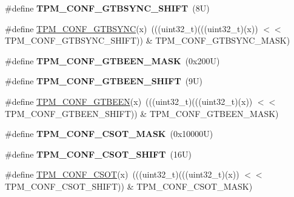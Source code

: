 \begin{DoxyCompactItemize}
\mbox{\label{group___t_p_m___register___masks_ga21d544c3b37febeee7525c8246d7f553}} 
\#define {\bfseries T\+P\+M\+\_\+\+C\+O\+N\+F\+\_\+\+G\+T\+B\+S\+Y\+N\+C\+\_\+\+S\+H\+I\+FT}~(8\+U)
\item 
\#define \mbox{\hyperlink{group___t_p_m___register___masks_ga640f2f1cb26cdd0af7ddb04c89bab413}{T\+P\+M\+\_\+\+C\+O\+N\+F\+\_\+\+G\+T\+B\+S\+Y\+NC}}(x)~(((uint32\+\_\+t)(((uint32\+\_\+t)(x)) $<$$<$ T\+P\+M\+\_\+\+C\+O\+N\+F\+\_\+\+G\+T\+B\+S\+Y\+N\+C\+\_\+\+S\+H\+I\+FT)) \& T\+P\+M\+\_\+\+C\+O\+N\+F\+\_\+\+G\+T\+B\+S\+Y\+N\+C\+\_\+\+M\+A\+SK)
\item 
\mbox{\label{group___t_p_m___register___masks_ga70d64b81799a4ecd3933ea8e46618747}} 
\#define {\bfseries T\+P\+M\+\_\+\+C\+O\+N\+F\+\_\+\+G\+T\+B\+E\+E\+N\+\_\+\+M\+A\+SK}~(0x200\+U)
\item 
\mbox{\label{group___t_p_m___register___masks_ga6ecd0b94ee9f74112c93027dd5833468}} 
\#define {\bfseries T\+P\+M\+\_\+\+C\+O\+N\+F\+\_\+\+G\+T\+B\+E\+E\+N\+\_\+\+S\+H\+I\+FT}~(9\+U)
\item 
\#define \mbox{\hyperlink{group___t_p_m___register___masks_ga3bfa358856f5e6b0b21566a15f371b01}{T\+P\+M\+\_\+\+C\+O\+N\+F\+\_\+\+G\+T\+B\+E\+EN}}(x)~(((uint32\+\_\+t)(((uint32\+\_\+t)(x)) $<$$<$ T\+P\+M\+\_\+\+C\+O\+N\+F\+\_\+\+G\+T\+B\+E\+E\+N\+\_\+\+S\+H\+I\+FT)) \& T\+P\+M\+\_\+\+C\+O\+N\+F\+\_\+\+G\+T\+B\+E\+E\+N\+\_\+\+M\+A\+SK)
\item 
\mbox{\label{group___t_p_m___register___masks_gab1950d4b5e28ba67b305e3fca7f716f0}} 
\#define {\bfseries T\+P\+M\+\_\+\+C\+O\+N\+F\+\_\+\+C\+S\+O\+T\+\_\+\+M\+A\+SK}~(0x10000\+U)
\item 
\mbox{\label{group___t_p_m___register___masks_ga007e2eccc45940318d15822a729ca061}} 
\#define {\bfseries T\+P\+M\+\_\+\+C\+O\+N\+F\+\_\+\+C\+S\+O\+T\+\_\+\+S\+H\+I\+FT}~(16\+U)
\item 
\#define \mbox{\hyperlink{group___t_p_m___register___masks_ga3a769eea9b0e3abc8a49f7a13111b896}{T\+P\+M\+\_\+\+C\+O\+N\+F\+\_\+\+C\+S\+OT}}(x)~(((uint32\+\_\+t)(((uint32\+\_\+t)(x)) $<$$<$ T\+P\+M\+\_\+\+C\+O\+N\+F\+\_\+\+C\+S\+O\+T\+\_\+\+S\+H\+I\+FT)) \& T\+P\+M\+\_\+\+C\+O\+N\+F\+\_\+\+C\+S\+O\+T\+\_\+\+M\+A\+SK)
$$
\end{DoxyCompactItemize}
